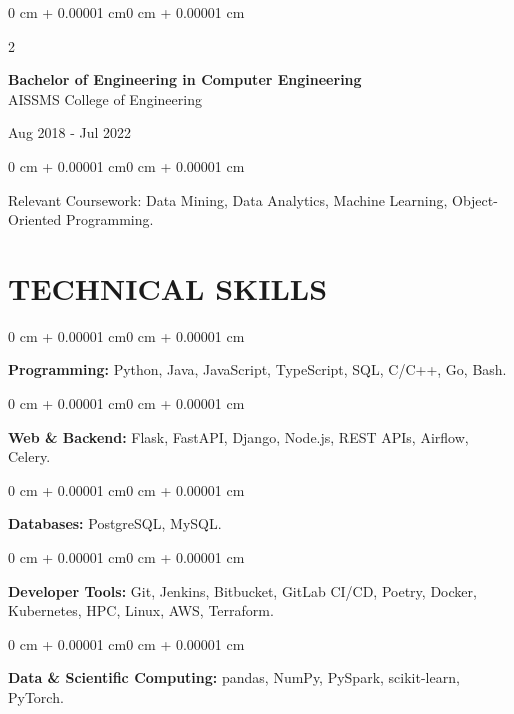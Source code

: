 \documentclass[10pt, letterpaper]{article}
\newenvironment{onecolentry}{
    \begin{adjustwidth}{0 cm + 0.00001 cm}{0 cm + 0.00001 cm}
}{
    \end{adjustwidth}
}
\newenvironment{twocolentry}[2][]{
    \onecolentry
    \def\secondColumn{#2}
    \setcolumnwidth{\fill, 4.5 cm}
    \begin{paracol}{2}
}{
    \switchcolumn \raggedleft \secondColumn
    \end{paracol}
    \endonecolentry
}
\begin{document}
\begin{twocolentry}{
    Aug 2018 - Jul 2022
}
    \textbf{Bachelor of Engineering in Computer Engineering} \\
    AISSMS College of Engineering
\end{twocolentry}
\begin{onecolentry}
Relevant Coursework: Data Mining, Data Analytics, Machine Learning, Object-Oriented Programming.
\end{onecolentry}
\section{TECHNICAL SKILLS}
\begin{onecolentry}
\textbf{Programming:} Python, Java, JavaScript, TypeScript, SQL, C/C++, Go, Bash.
\end{onecolentry}
\vspace{0.06 cm}
\begin{onecolentry}
\textbf{Web \& Backend:} Flask, FastAPI, Django, Node.js, REST APIs, Airflow, Celery.
\end{onecolentry}
\vspace{0.06 cm}
\begin{onecolentry}
\textbf{Databases:} PostgreSQL, MySQL.
\end{onecolentry}
\vspace{0.06 cm}
\begin{onecolentry}
\textbf{Developer Tools:} Git, Jenkins, Bitbucket, GitLab CI/CD, Poetry, Docker, Kubernetes, HPC, Linux, AWS, Terraform.
\end{onecolentry}
\vspace{0.06 cm}
\begin{onecolentry}
\textbf{Data \& Scientific Computing:} pandas, NumPy, PySpark, scikit-learn, PyTorch.
\end{onecolentry}

\end{document}
